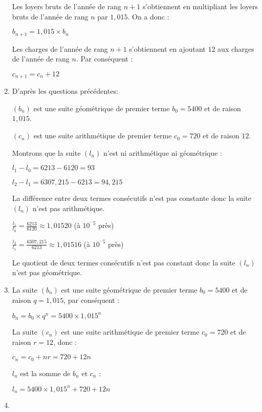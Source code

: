 \begin{corrige}
\begin{enumerate}
          Les loyers bruts de l'année de rang $n+1$ s'obtiennent en multipliant les loyers bruts de l'année de rang $n$ par $1,015$. On a donc :
          \par
          $b_{n+1}=1,015 \times b_n$
          \par
          Les charges de l'année de rang $n+1$ s'obtiennent en ajoutant $12$ aux charges de l'année de rang $n$. Par conséquent :
          \par
          $c_{n+1}=c_n+12$
          \item
          D'après les questions précédentes:
          \par
          $(b_n)$ est une suite géométrique de premier terme $b_0=5400$ et de raison $1,015$.
          \par
          $(c_n)$ est une suite arithmétique de premier terme $c_0=720$ et de raison $12$.
          \par
          Montrons que la suite $(l_n)$ n'est ni arithmétique ni géométrique :
          \par
          $l_1-l_0=6213-6120=93$
          \par
          $l_2-l_1=6307,215-6213=94,215$
          \par
          La différence entre deux termes consécutifs n'est pas constante donc la suite $(l_n)$ n'est pas arithmétique.
          \par
          $ \frac{l_1}{l_0} = \frac{6213}{6120}  \approx 1,01520$ (à $10^{^-5}$ près)
          \par
          $\frac{l_2}{l_1} = \frac{6307,215}{6213}  \approx 1,01516$ (à $10^{^-5}$ près)
          \par
          Le quotient de deux termes consécutifs n'est pas constant donc la suite $(l_n)$ n'est pas géométrique.
          \item
          La suite $(b_n)$ est une suite géométrique de premier terme $b_0=5400$ et de raison $q=1,015$, par conséquent :
          \par
          $b_n=b_0 \times q^n=5400 \times 1,015^n$
          \par
          La suite $(c_n)$ est une suite arithmétique de premier terme $c_0=720$ et de raison $r=12$, donc :
          \par
          $c_n=c_0 + n r=720 + 12n$
          \par
          $l_n$ est la somme de $b_n$ et $c_n$ :
          \par
          $l_n=5400 \times 1,015^n+720+12n
          $
          \item

\end{enumerate}
\end{corrige}
